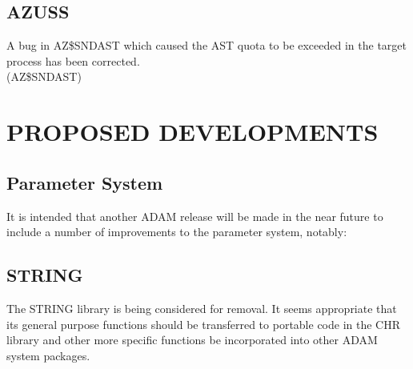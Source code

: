 \subsection{AZUSS}
A bug in AZ\$SNDAST which caused the AST quota to be exceeded in the target
process has been corrected.\\
(AZ\$SNDAST)

\section{PROPOSED DEVELOPMENTS}
\subsection{Parameter System}
It is intended that another ADAM release will be made in the near future to
include a number of improvements to the parameter system, notably:

\subsection{STRING}
The STRING library is being considered for removal. It seems appropriate that
its general purpose functions should be transferred to portable code in the
CHR library and other more specific functions be incorporated into other
ADAM system packages.

